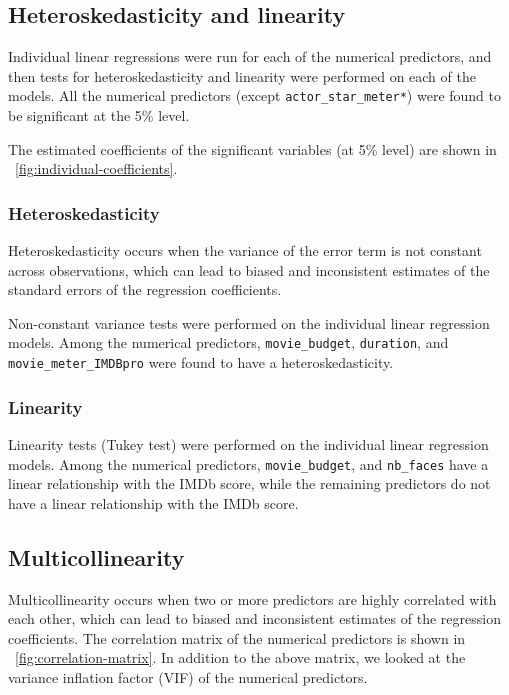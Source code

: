 \documentclass[12pt,a4paper]{article}
\begin{document}
\subsection{Heteroskedasticity and linearity}\label{subsec:heteroskedasticity-linearity}
Individual linear regressions were run for each of the numerical predictors, and then tests for heteroskedasticity and linearity were performed on each of the models.
All the numerical predictors (except \texttt{actor\_star\_meter*}) were found to be significant at the 5\% level.

The estimated coefficients of the significant variables (at 5\% level) are shown in \figurename~\ref{fig:individual-coefficients}.

\subsubsection{Heteroskedasticity}\label{subsubsec:heteroskedasticity}
Heteroskedasticity occurs when the variance of the error term is not constant across observations, which can lead to biased and inconsistent estimates of the standard errors of the regression coefficients.

Non-constant variance tests were performed on the individual linear regression models.
Among the numerical predictors, \texttt{movie\_budget}, \texttt{duration}, and \texttt{movie\_meter\_IMDBpro} were found to have a heteroskedasticity.

\subsubsection{Linearity}\label{subsubsec:linearity}
Linearity tests (Tukey test) were performed on the individual linear regression models.
Among the numerical predictors, \texttt{movie\_budget}, and \texttt{nb\_faces} have a linear relationship with the IMDb score, while the remaining predictors do not have a linear relationship with the IMDb score.

\subsection{Multicollinearity}\label{subsec:multicollinearity}
Multicollinearity occurs when two or more predictors are highly correlated with each other, which can lead to biased and inconsistent estimates of the regression coefficients.
The correlation matrix of the numerical predictors is shown in \figurename~\ref{fig:correlation-matrix}.
In addition to the above matrix, we looked at the variance inflation factor (VIF) of the numerical predictors.
\end{document}
